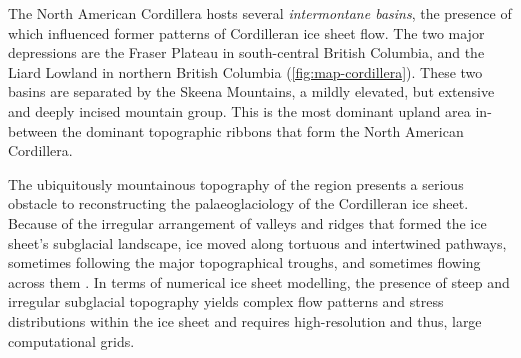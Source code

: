 \documentclass{article}
\begin{document}
The North American Cordillera hosts several \emph{intermontane basins}, the
presence
of which influenced former patterns of Cordilleran ice sheet flow. The two
major depressions are the Fraser Plateau in south-central British Columbia, and
the Liard Lowland in northern British Columbia (\cref{fig:map-cordillera}).
These two basins are separated by the Skeena Mountains, a mildly elevated, but
extensive and deeply incised mountain group. This is the most dominant upland
area in-between the dominant topographic ribbons that form the North American
Cordillera.

The ubiquitously mountainous topography of the region presents a serious
obstacle to reconstructing the palaeoglaciology of the Cordilleran ice sheet.
Because of the irregular arrangement of valleys and ridges that formed the ice
sheet's subglacial landscape, ice moved along tortuous and intertwined
pathways, sometimes following the major topographical troughs, and sometimes
flowing across them \citep{Davis.Mathews.1944, Kleman.etal.2010}. In terms of
numerical ice sheet modelling, the presence of steep and irregular subglacial
topography yields complex flow patterns and stress distributions within the ice
sheet and requires high-resolution and thus, large computational grids.
\end{document}
